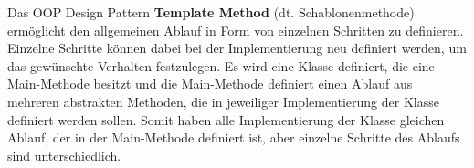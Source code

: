Das OOP Design Pattern \textbf{Template Method} (dt. Schablonenmethode) ermöglicht den allgemeinen Ablauf in Form von einzelnen Schritten zu definieren.
Einzelne Schritte können dabei bei der Implementierung neu definiert werden, um das gewünschte Verhalten festzulegen.
Es wird eine Klasse definiert, die eine Main-Methode besitzt und die Main-Methode 
definiert einen Ablauf aus mehreren abstrakten Methoden, die in jeweiliger 
Implementierung der Klasse definiert werden sollen. Somit haben alle Implementierung 
der Klasse gleichen Ablauf, der in der Main-Methode definiert ist, 
aber einzelne Schritte des Ablaufs sind unterschiedlich.